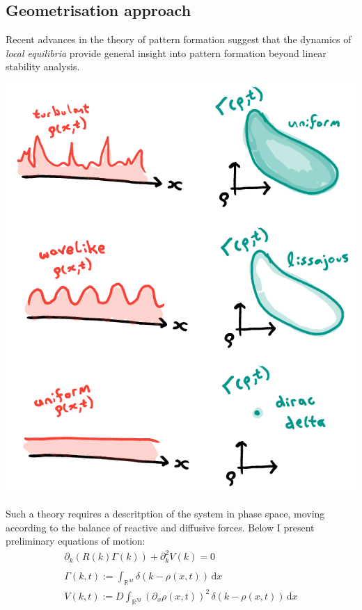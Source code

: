 \documentclass[a0,portrait]{a0poster}
\begin{document}
\begin{multicols}{3}
\section{Geometrisation approach}
Recent advances in the theory of pattern formation \cite{Halatek2018} suggest that
the dynamics of \textit{local equilibria} provide general insight into pattern
formation beyond linear stability analysis.
\begin{center}
\includegraphics[width=0.99\linewidth]{motivation}
\end{center}
Such a theory requires a descritption of the system in phase space, moving according
to the balance of reactive and diffusive forces. Below I present preliminary equations
of motion:\\
\large\begin{align*}
	\partial_k\left(R(k)\Gamma(k)\right)+\partial_k^2 V(k)=0\qquad\quad
	\\\\
	\Gamma(k,t):=\int_{\mathbb{R}^M}\!\delta(k-\rho(x,t))\,\mathrm{d}x\qquad\quad
	\\
	V(k,t):=D\int_{\mathbb{R}^M}\!
		(\partial_x\rho(x,t))^2\,\delta(k-\rho(x,t))\,\mathrm{d}x

\end{align*}
\end{multicols}
\end{document}
